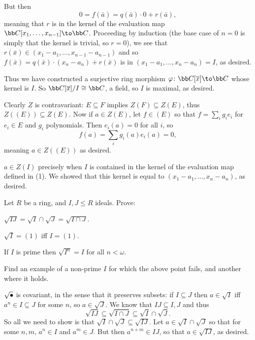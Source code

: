     But then
    $$ 0 = f(\bar a) = q(\bar a)\cdot0 + r(\bar a) , $$
    meaning that $r$ is in the kernel of the evaluation map $\bC[x_1,\dots,x_{n-1}]\to\bC$.
    Proceeding by induction (the base case of $n=0$ is simply that the kernel is trivial, so $r=0$), we see that $r(\bar x)\in(x_1-a_1,\dots,x_{n-1}-a_{n-1})$ and so
    $f(\bar x)=q(\bar x)\cdot(x_n-a_n)+r(\bar x)$ is in $(x_1-a_1,\dots,x_n-a_n)=I$, as desired.

    Thus we have constructed a surjective ring morphism $\phi\colon\bC[\bar x]\to\bC$ whose kernel is $I$.
    So $\bC[\bar x]/I\cong\bC$, a field, so $I$ is maximal, as desired.

    \item Clearly $Z$ is contravariant: $E\subseteq F$ implies $Z(F)\subseteq Z(E)$, thus $Z((E))\subseteq Z(E)$.
    Now if $a\in Z(E)$, let $f\in(E)$ so that $f=\sum_i g_ie_i$ for $e_i\in E$ and $g_i$ polynomials.
    Then $e_i(a)=0$ for all $i$, so
    $$ f(a) = \sum_i g_i(a)e_i(a) = 0 , $$
    meaning $a\in Z((E))$ as desired.

    \item $a\in Z(I)$ precisely when $I$ is contained in the kernel of the evaluation map defined in (1).
    We showed that this kernel is equal to $(x_1-a_1,\dots,x_n-a_n)$, as desired.
\eenum

\bprob

    Let $R$ be a ring, and $I,J\leq R$ ideals.
    Prove:
    \benum
        \item $\sqrt{IJ}=\sqrt I\cap\sqrt J=\sqrt{I\cap J}$.
        \item $\sqrt I=(1)$ iff $I=(1)$.
        \item If $I$ is prime then $\sqrt{I^n}=I$ for all $n<\omega$.
        \item Find an example of a non-prime $I$ for which the above point fails, and another where it holds.
    \eenum

\eprob

\benum
    \item $\sqrt{\bullet}$ is covariant, in the sense that it preserves subsets: if $I\subseteq J$ then $a\in\sqrt I$ iff $a^n\in I\subseteq J$ for some $n$,
    so $a\in\sqrt J$.
    We know that $IJ\subseteq I,J$ and thus
    $$ \sqrt{IJ} \subseteq \sqrt{I\cap J} \subseteq \sqrt I\cap\sqrt J . $$
    So all we need to show is that $\sqrt I\cap\sqrt J\subseteq\sqrt{IJ}$.
    Let $a\in\sqrt I\cap\sqrt J$ so that for some $n,m$, $a^n\in I$ and $a^m\in J$.
    But then $a^{n+m}\in IJ$, so that $a\in\sqrt{IJ}$, as desired.

